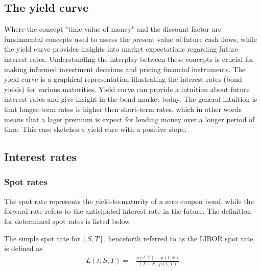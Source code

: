 \subsection{The yield curve}
Where the concept "time value of money" and the discount factor are fundamental concepts used to assess the present value of future
cash flows, while the yield curve provides insights into market expectations regarding future interest rates.
Understanding the interplay between these concepts is crucial for making informed investment decisions and pricing
financial instruments. The yield curve is a graphical representation illustrating the interest rates (bond yields) for various maturities.
Yield curve can provide a intuition about future interest rates and give insight in the bond market today. 
The general intuition is that longer-term rates is higher then short-term rates, which in other words means that a
lager premium is expect for lending money over a longer period of time. This case sketches a yield cure with a 
positive slope.
\subsection{Interest rates}
\subsubsection{Spot rates}
The spot rate represents the yield-to-maturity of a zero coupon bond,
while the forward rate refers to the anticipated interest rate in the 
future. The definition for determined spot rates is listed 
below
\begin{definition}\label{def:spot}
    The simple spot rate for $[S,T]$, henceforth referred to as the 
    LIBOR spot rate, is defined as \cite{Bjork} 
    \begin{align*}
        L(t;S,T) = - \frac{p(t,T)-p(t,S)}{(T-S)p(t,T)}
    \end{align*}
\end{definition} 
